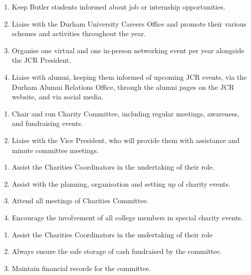 \begin{enumerate}
    \item Keep Butler students informed about job or internship opportunities.
    \item Liaise with the Durham University Careers Office and promote their various schemes and activities throughout the year.
    \item Organise one virtual and one in-person networking event per year alongside the JCR President.
    \item Liaise with alumni, keeping them informed of upcoming JCR events, via the Durham Alumni Relations Office, through the alumni pages on the JCR website, and via social media. 
    
\end{enumerate}

\begin{enumerate}
    \item Chair and run Charity Committee, including regular meetings, awareness, and fundraising events.
    \item Liaise with the Vice President, who will provide them with assistance and minute committee meetings.
    
\end{enumerate}

\begin{enumerate}
    \item Assist the Charities Coordinators in the undertaking of their role.
    \item Assist with the planning, organisation and setting up of charity events.
    \item Attend all meetings of Charities Committee.
    \item Encourage the involvement of all college members in special charity events.
\end{enumerate}

\begin{enumerate}
    \item Assist the Charities Coordinators in the undertaking of their role
    \item Always ensure the safe storage of cash fundraised by the committee.
    \item  Maintain financial records for the committee.
\end{enumerate}

